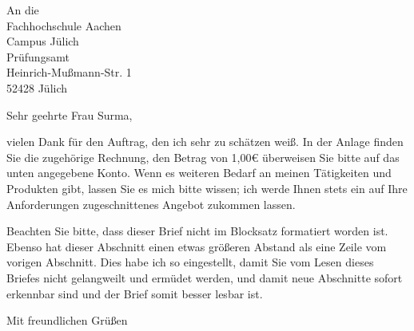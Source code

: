 \documentclass[version=last, ngerman]{scrlttr2}
\begin{document}
\begin{letter}
  {%
   An die \\                    %
   Fachhochschule Aachen \\     %
   Campus Jülich \\             %
   Prüfungsamt \\
   Heinrich-Mußmann-Str. 1 \\[3mm] %
   52428 Jülich                 %
  }

  \opening{Sehr geehrte Frau Surma,}
  
  vielen Dank für den Auftrag, den ich sehr zu schätzen weiß. In der Anlage finden Sie die zugehörige Rechnung, den Betrag von 1,00€ überweisen Sie bitte auf das unten angegebene Konto. Wenn es weiteren Bedarf an meinen Tätigkeiten
  und Produkten gibt, lassen Sie es mich bitte wissen; ich werde Ihnen stets
  ein auf Ihre Anforderungen zugeschnittenes Angebot zukommen lassen.
  
  Beachten Sie bitte, dass dieser Brief nicht im Blocksatz formatiert worden
  ist. Ebenso hat dieser Abschnitt einen etwas größeren Abstand 
  als eine Zeile vom vorigen Abschnitt. Dies habe ich so eingestellt,
  damit Sie vom Lesen dieses Briefes nicht gelangweilt und ermüdet werden,
  und damit neue Abschnitte sofort erkennbar sind und der Brief somit besser
  lesbar ist. 
  
  \closing{Mit freundlichen Grüßen}
\end{letter}
  
\end{document}
